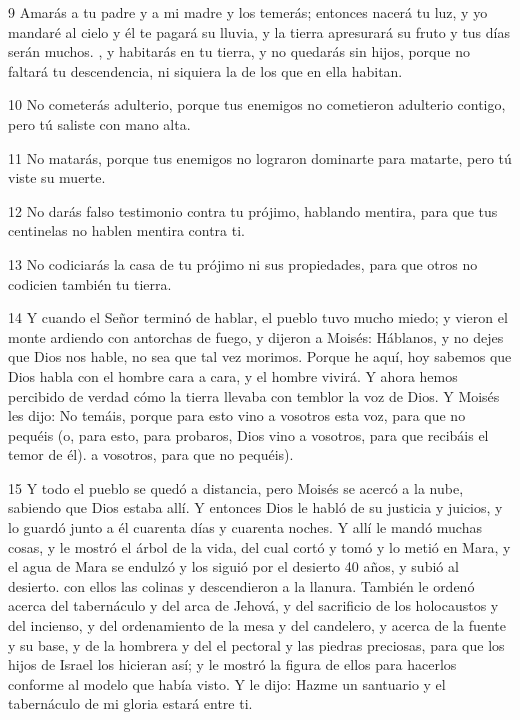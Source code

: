 \par 9 Amarás a tu padre y a mi madre y los temerás; entonces nacerá tu luz, y yo mandaré al cielo y él te pagará su lluvia, y la tierra apresurará su fruto y tus días serán muchos. , y habitarás en tu tierra, y no quedarás sin hijos, porque no faltará tu descendencia, ni siquiera la de los que en ella habitan.

\par 10 No cometerás adulterio, porque tus enemigos no cometieron adulterio contigo, pero tú saliste con mano alta.

\par 11 No matarás, porque tus enemigos no lograron dominarte para matarte, pero tú viste su muerte.

\par 12 No darás falso testimonio contra tu prójimo, hablando mentira, para que tus centinelas no hablen mentira contra ti.

\par 13 No codiciarás la casa de tu prójimo ni sus propiedades, para que otros no codicien también tu tierra.

\par 14 Y cuando el Señor terminó de hablar, el pueblo tuvo mucho miedo; y vieron el monte ardiendo con antorchas de fuego, y dijeron a Moisés: Háblanos, y no dejes que Dios nos hable, no sea que tal vez morimos. Porque he aquí, hoy sabemos que Dios habla con el hombre cara a cara, y el hombre vivirá. Y ahora hemos percibido de verdad cómo la tierra llevaba con temblor la voz de Dios. Y Moisés les dijo: No temáis, porque para esto vino a vosotros esta voz, para que no pequéis (o, para esto, para probaros, Dios vino a vosotros, para que recibáis el temor de él). a vosotros, para que no pequéis).

\par 15 Y todo el pueblo se quedó a distancia, pero Moisés se acercó a la nube, sabiendo que Dios estaba allí. Y entonces Dios le habló de su justicia y juicios, y lo guardó junto a él cuarenta días y cuarenta noches. Y allí le mandó muchas cosas, y le mostró el árbol de la vida, del cual cortó y tomó y lo metió en Mara, y el agua de Mara se endulzó y los siguió por el desierto 40 años, y subió al desierto. con ellos las colinas y descendieron a la llanura. También le ordenó acerca del tabernáculo y del arca de Jehová, y del sacrificio de los holocaustos y del incienso, y del ordenamiento de la mesa y del candelero, y acerca de la fuente y su base, y de la hombrera y del el pectoral y las piedras preciosas, para que los hijos de Israel los hicieran así; y le mostró la figura de ellos para hacerlos conforme al modelo que había visto. Y le dijo: Hazme un santuario y el tabernáculo de mi gloria estará entre ti.

